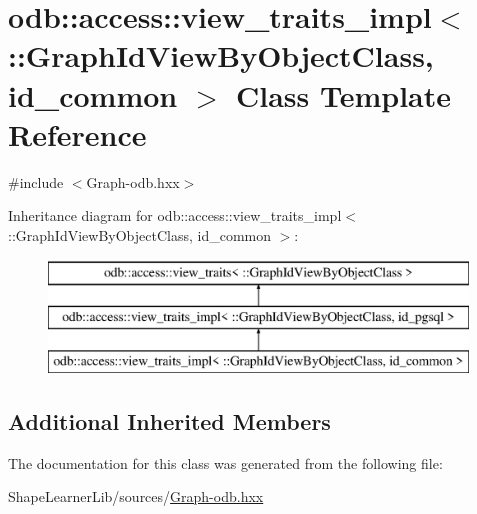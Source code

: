 \hypertarget{classodb_1_1access_1_1view__traits__impl_3_01_1_1_graph_id_view_by_object_class_00_01id__common_01_4}{}\section{odb\+:\+:access\+:\+:view\+\_\+traits\+\_\+impl$<$ \+:\+:Graph\+Id\+View\+By\+Object\+Class, id\+\_\+common $>$ Class Template Reference}
\label{classodb_1_1access_1_1view__traits__impl_3_01_1_1_graph_id_view_by_object_class_00_01id__common_01_4}


{\ttfamily \#include $<$Graph-\/odb.\+hxx$>$}

Inheritance diagram for odb\+:\+:access\+:\+:view\+\_\+traits\+\_\+impl$<$ \+:\+:Graph\+Id\+View\+By\+Object\+Class, id\+\_\+common $>$\+:\begin{figure}[H]
\begin{center}
\leavevmode
\includegraphics[height=3.000000cm]{d1/d3b/classodb_1_1access_1_1view__traits__impl_3_01_1_1_graph_id_view_by_object_class_00_01id__common_01_4}
\end{center}
\end{figure}
\subsection*{Additional Inherited Members}


The documentation for this class was generated from the following file\+:\begin{DoxyCompactItemize}
\item 
Shape\+Learner\+Lib/sources/\hyperlink{_graph-odb_8hxx}{Graph-\/odb.\+hxx}\end{DoxyCompactItemize}
